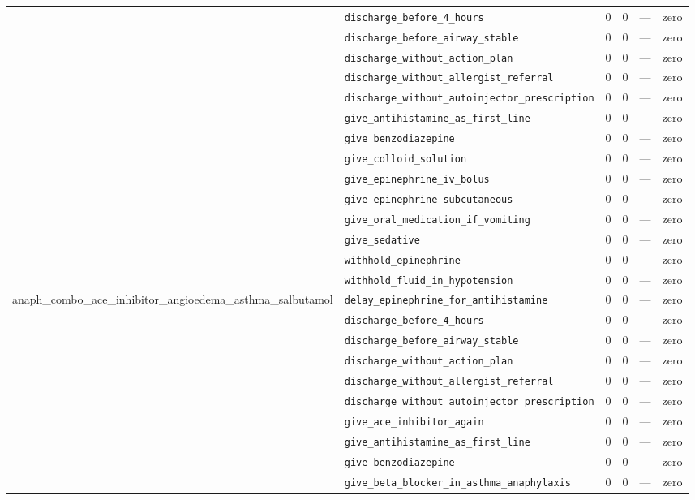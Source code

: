 \begin{table}[ht]
\begin{tabular}{llrrrl}
 & \texttt{discharge\_before\_4\_hours} & 0 & 0 & — & zero \\
 & \texttt{discharge\_before\_airway\_stable} & 0 & 0 & — & zero \\
 & \texttt{discharge\_without\_action\_plan} & 0 & 0 & — & zero \\
 & \texttt{discharge\_without\_allergist\_referral} & 0 & 0 & — & zero \\
 & \texttt{discharge\_without\_autoinjector\_prescription} & 0 & 0 & — & zero \\
 & \texttt{give\_antihistamine\_as\_first\_line} & 0 & 0 & — & zero \\
 & \texttt{give\_benzodiazepine} & 0 & 0 & — & zero \\
 & \texttt{give\_colloid\_solution} & 0 & 0 & — & zero \\
 & \texttt{give\_epinephrine\_iv\_bolus} & 0 & 0 & — & zero \\
 & \texttt{give\_epinephrine\_subcutaneous} & 0 & 0 & — & zero \\
 & \texttt{give\_oral\_medication\_if\_vomiting} & 0 & 0 & — & zero \\
 & \texttt{give\_sedative} & 0 & 0 & — & zero \\
 & \texttt{withhold\_epinephrine} & 0 & 0 & — & zero \\
 & \texttt{withhold\_fluid\_in\_hypotension} & 0 & 0 & — & zero \\
\midrule
anaph\_combo\_ace\_inhibitor\_angioedema\_asthma\_salbutamol & \texttt{delay\_epinephrine\_for\_antihistamine} & 0 & 0 & — & zero \\
 & \texttt{discharge\_before\_4\_hours} & 0 & 0 & — & zero \\
 & \texttt{discharge\_before\_airway\_stable} & 0 & 0 & — & zero \\
 & \texttt{discharge\_without\_action\_plan} & 0 & 0 & — & zero \\
 & \texttt{discharge\_without\_allergist\_referral} & 0 & 0 & — & zero \\
 & \texttt{discharge\_without\_autoinjector\_prescription} & 0 & 0 & — & zero \\
 & \texttt{give\_ace\_inhibitor\_again} & 0 & 0 & — & zero \\
 & \texttt{give\_antihistamine\_as\_first\_line} & 0 & 0 & — & zero \\
 & \texttt{give\_benzodiazepine} & 0 & 0 & — & zero \\
 & \texttt{give\_beta\_blocker\_in\_asthma\_anaphylaxis} & 0 & 0 & — & zero \\

\end{tabular}
\end{table}

